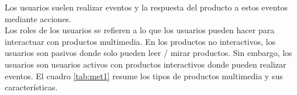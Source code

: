 Los usuarios suelen realizar eventos y la respuesta del producto a estos eventos mediante acciones.\\
Los roles de los usuarios se refieren a lo que los usuarios pueden hacer para interactuar con productos multimedia. En los productos no interactivos, los usuarios son pasivos donde 
solo pueden leer / mirar productos. Sin embargo, los usuarios son usuarios activos con productos interactivos donde pueden realizar eventos. El cuadro \ref{tab:met1}  resume los tipos de productos 
multimedia y sus características.

